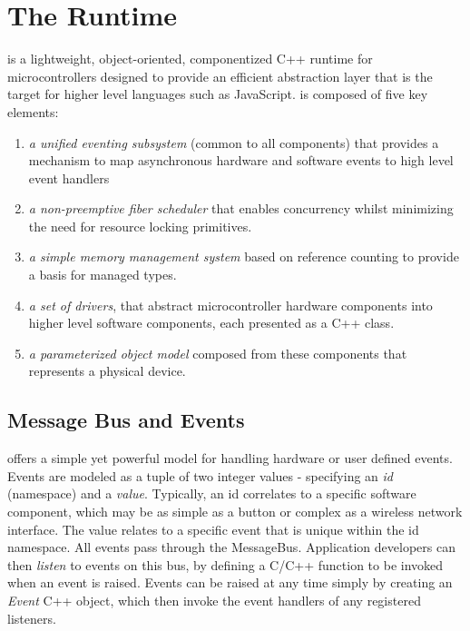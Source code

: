 \section{The \CO Runtime}
\label{sec:codal}

\CO is a lightweight, object-oriented, componentized C++ runtime for microcontrollers designed to provide an efficient abstraction layer that is the target for higher level languages such as JavaScript. \CO is composed of five key elements:

\begin{enumerate}
\item \emph{a unified eventing subsystem} (common to all components) that provides a mechanism to map asynchronous hardware and software events to high level event handlers
\item \emph{a non-preemptive fiber scheduler} that enables concurrency whilst minimizing the need for resource locking primitives.
\item \emph{a simple memory management system} based on reference counting to provide a basis for managed types.
\item \emph{a set of drivers}, that abstract microcontroller hardware components into higher level software components, each presented as a C++ class.
\item \emph{a parameterized object model} composed from these components that represents a physical device.
\end{enumerate}

\subsection{Message Bus and Events}

\CO offers a simple yet powerful model for handling hardware or user defined events. Events are modeled as a tuple of two integer values - specifying an \emph{id} (namespace) and a \emph{value}.
Typically, an id correlates to a specific software component, which may be as simple as a button or complex as a wireless network interface. The value relates to a specific event that is unique within the id namespace. All events pass through the \CO MessageBus. Application developers can then \emph{listen} to events on this bus, by defining a C/C++ function to be invoked when an event is raised. Events can be raised at any time simply by creating an \emph{Event} C++ object, which then invoke the event handlers of any registered listeners.

